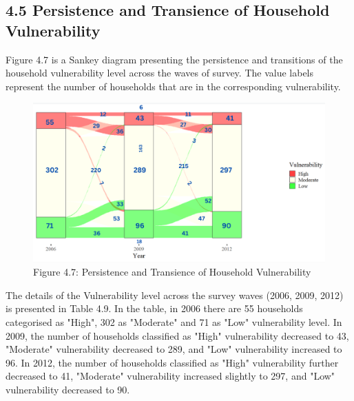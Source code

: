 \subsection*{4.5 Persistence and Transience of Household Vulnerability}
\renewcommand{\thepage}{\arabic{page}}
Figure 4.7 is a Sankey diagram presenting the persistence and transitions of the household vulnerability level across the waves of survey. The value labels represent the number of households that are in the corresponding vulnerability. \\

\begin{figure}[H]
	\includegraphics[scale=0.6]{Graphs and figures/Sankey.png}
	\captionsetup{labelformat=empty}
	\caption{Figure 4.7: Persistence and Transience of Household Vulnerability}
	\setlength{\abovecaptionskip}{2pt}
	\label{fig:hviletecomponents}
\end{figure}

The details of the Vulnerability level across the survey waves (2006, 2009, 2012) is presented in Table 4.9. In the table, in 2006 there are 55 households categorised as "High", 302 as "Moderate" and 71 as "Low" vulnerability level. In 2009, the number of households classified as "High" vulnerability decreased to 43, "Moderate" vulnerability decreased to 289, and "Low" vulnerability increased to 96.
In 2012, the number of households classified as "High" vulnerability further decreased to 41, "Moderate" vulnerability increased slightly to 297, and "Low" vulnerability decreased to 90.

